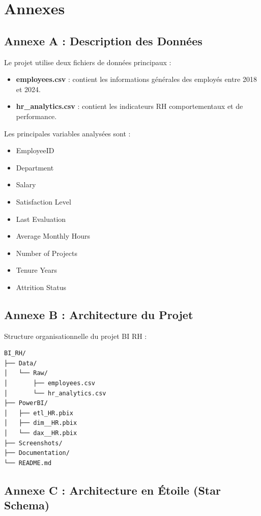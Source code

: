 \chapter*{Annexes}

\section*{Annexe A : Description des Données}

Le projet utilise deux fichiers de données principaux :

\begin{itemize}
    \item \textbf{employees.csv} : contient les informations générales des employés entre 2018 et 2024.
    \item \textbf{hr\_analytics.csv} : contient les indicateurs RH comportementaux et de performance.
\end{itemize}

Les principales variables analysées sont :

\begin{itemize}
    \item EmployeeID
    \item Department
    \item Salary
    \item Satisfaction Level
    \item Last Evaluation
    \item Average Monthly Hours
    \item Number of Projects
    \item Tenure Years
    \item Attrition Status
\end{itemize}

\section*{Annexe B : Architecture du Projet}

Structure organisationnelle du projet BI RH :

\begin{verbatim}
BI_RH/
├── Data/
│   └── Raw/
│       ├── employees.csv
│       └── hr_analytics.csv
├── PowerBI/
│   ├── etl_HR.pbix
│   ├── dim__HR.pbix
│   └── dax__HR.pbix
├── Screenshots/
├── Documentation/
└── README.md
\end{verbatim}

\section*{Annexe C : Architecture en Étoile (Star Schema)}

